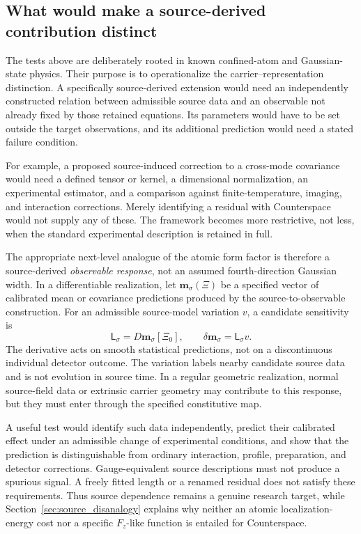 \documentclass[11pt,a4paper]{article}
\theoremstyle{definition}
\theoremstyle{remark}
\begin{document}
\subsection{What would make a source-derived contribution distinct}
\label{sec:source_observable}
The tests above are deliberately rooted in known confined-atom and Gaussian-state physics. Their purpose is to operationalize the carrier--representation distinction. A specifically source-derived extension would need an independently constructed relation between admissible source data and an observable not already fixed by those retained equations. Its parameters would have to be set outside the target observations, and its additional prediction would need a stated failure condition.\cite{foundation,planck}

For example, a proposed source-induced correction to a cross-mode covariance would need a defined tensor or kernel, a dimensional normalization, an experimental estimator, and a comparison against finite-temperature, imaging, and interaction corrections. Merely identifying a residual with Counterspace would not supply any of these. The framework becomes more restrictive, not less, when the standard experimental description is retained in full.

The appropriate next-level analogue of the atomic form factor is therefore a source-derived \emph{observable response}, not an assumed fourth-direction Gaussian width. In a differentiable realization, let $\boldsymbol m_\sigma(\Xi)$ be a specified vector of calibrated mean or covariance predictions produced by the source-to-observable construction. For an admissible source-model variation $v$, a candidate sensitivity is
\[
 \mathsf L_\sigma=D\boldsymbol m_\sigma[\Xi_0],
 \qquad \delta\boldsymbol m_\sigma=\mathsf L_\sigma v.
\]
The derivative acts on smooth statistical predictions, not on a discontinuous individual detector outcome. The variation labels nearby candidate source data and is not evolution in source time. In a regular geometric realization, normal source-field data or extrinsic carrier geometry may contribute to this response, but they must enter through the specified constitutive map.\cite{foundation}

A useful test would identify such data independently, predict their calibrated effect under an admissible change of experimental conditions, and show that the prediction is distinguishable from ordinary interaction, profile, preparation, and detector corrections. Gauge-equivalent source descriptions must not produce a spurious signal. A freely fitted length or a renamed residual does not satisfy these requirements. Thus source dependence remains a genuine research target, while Section~\ref{sec:source_disanalogy} explains why neither an atomic localization-energy cost nor a specific $F_z$-like function is entailed for Counterspace.\cite{foundation,planck}
\end{document}
